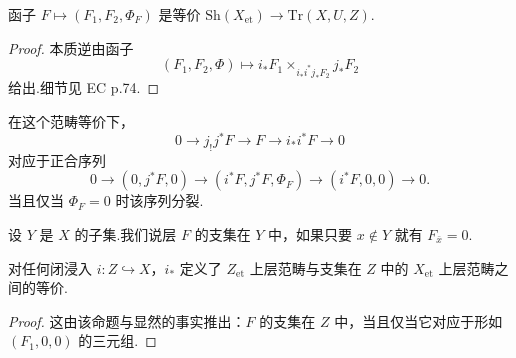 \begin{proposition}\label{prop:8.17}
函子 $F \mapsto (F_1, F_2, \Phi_F)$ 是等价 $\mathrm{Sh}(X_{\mathrm{et}}) \to \mathrm{Tr}(X, U, Z)$.
\end{proposition}

\begin{proof}
本质逆由函子
\[
(F_1, F_2, \Phi) \mapsto i_{*}F_1 \times_{i_{*}i^{*}j_{*}F_2} j_{*}F_2
\]
给出.细节见 EC p.74.
\end{proof}

在这个范畴等价下，
\[
0 \to j_{!}j^{*}F \to F \to i_{*}i^{*}F \to 0
\]
对应于正合序列
\[
0 \to (0, j^{*}F, 0) \to (i^{*}F, j^{*}F, \Phi_F) \to (i^{*}F, 0, 0) \to 0.
\]
当且仅当 $\Phi_F = 0$ 时该序列分裂.

设 $Y$ 是 $X$ 的子集.我们说层 $F$ 的支集在 $Y$ 中，如果只要 $x \notin Y$ 就有 $F_{\bar{x}} = 0$.

\begin{corollary}\label{cor:8.18}
对任何闭浸入 $i \colon Z \hookrightarrow X$，$i_{*}$ 定义了 $Z_{\mathrm{et}}$ 上层范畴与支集在 $Z$ 中的 $X_{\mathrm{et}}$ 上层范畴之间的等价.
\end{corollary}

\begin{proof}
这由该命题与显然的事实推出：$F$ 的支集在 $Z$ 中，当且仅当它对应于形如 $(F_1, 0, 0)$ 的三元组.
\end{proof}
